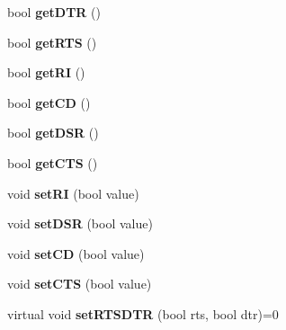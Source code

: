\begin{DoxyCompactItemize}
\item 
\hypertarget{classCSerial_a50dce09f07593bc4f45cd48571423750}{bool {\bfseries get\-D\-T\-R} ()}\label{classCSerial_a50dce09f07593bc4f45cd48571423750}

\item 
\hypertarget{classCSerial_a79eb1affc7b7f699dc7329c0c4566436}{bool {\bfseries get\-R\-T\-S} ()}\label{classCSerial_a79eb1affc7b7f699dc7329c0c4566436}

\item 
\hypertarget{classCSerial_afe27446d37079765f350746462c92c08}{bool {\bfseries get\-R\-I} ()}\label{classCSerial_afe27446d37079765f350746462c92c08}

\item 
\hypertarget{classCSerial_ad139515800d1af3e9dfb217b0e0fb4d2}{bool {\bfseries get\-C\-D} ()}\label{classCSerial_ad139515800d1af3e9dfb217b0e0fb4d2}

\item 
\hypertarget{classCSerial_a209004fedd6d31a4b7a7fca16ec8aca4}{bool {\bfseries get\-D\-S\-R} ()}\label{classCSerial_a209004fedd6d31a4b7a7fca16ec8aca4}

\item 
\hypertarget{classCSerial_a8a52a185b5f6db6c8ec8f09ff13c3fbb}{bool {\bfseries get\-C\-T\-S} ()}\label{classCSerial_a8a52a185b5f6db6c8ec8f09ff13c3fbb}

\item 
\hypertarget{classCSerial_a7a6232905a214c4eff81b3a6f72dfa72}{void {\bfseries set\-R\-I} (bool value)}\label{classCSerial_a7a6232905a214c4eff81b3a6f72dfa72}

\item 
\hypertarget{classCSerial_a4af51cec0821ca417a9f48e62faac6d8}{void {\bfseries set\-D\-S\-R} (bool value)}\label{classCSerial_a4af51cec0821ca417a9f48e62faac6d8}

\item 
\hypertarget{classCSerial_acd41d30ab6084029529b93141fbc31b2}{void {\bfseries set\-C\-D} (bool value)}\label{classCSerial_acd41d30ab6084029529b93141fbc31b2}

\item 
\hypertarget{classCSerial_a6caf533674711d97b7aed77f83aaa82a}{void {\bfseries set\-C\-T\-S} (bool value)}\label{classCSerial_a6caf533674711d97b7aed77f83aaa82a}

\item 
\hypertarget{classCSerial_ada8a1f2077454e088db6805b12e4616e}{virtual void {\bfseries set\-R\-T\-S\-D\-T\-R} (bool rts, bool dtr)=0}\label{classCSerial_ada8a1f2077454e088db6805b12e4616e}


\end{DoxyCompactItemize}

